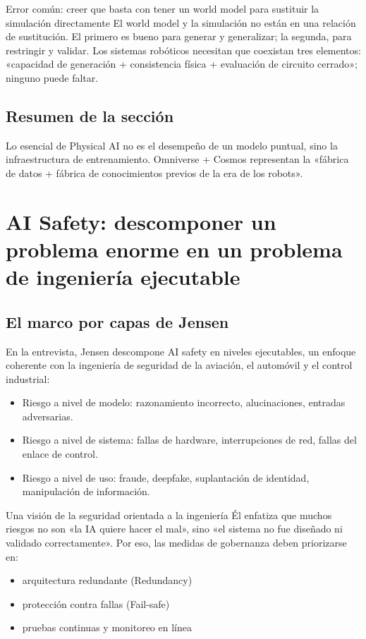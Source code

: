 \documentclass[a4paper]{article}
\begin{document}
\begin{warningbox}{Error común: creer que basta con tener un world model para sustituir la simulación directamente}
El world model y la simulación no están en una relación de sustitución. El primero es bueno para generar y generalizar; la segunda, para restringir y validar. Los sistemas robóticos necesitan que coexistan tres elementos: «capacidad de generación + consistencia física + evaluación de circuito cerrado»; ninguno puede faltar.
\end{warningbox}

\subsection{Resumen de la sección}
Lo esencial de Physical AI no es el desempeño de un modelo puntual, sino la infraestructura de entrenamiento. Omniverse + Cosmos representan la «fábrica de datos + fábrica de conocimientos previos de la era de los robots».

\section{AI Safety: descomponer un problema enorme en un problema de ingeniería ejecutable}

\subsection{El marco por capas de Jensen}

En la entrevista, Jensen descompone AI safety en niveles ejecutables, un enfoque coherente con la ingeniería de seguridad de la aviación, el automóvil y el control industrial:
\begin{itemize}
    \item Riesgo a nivel de modelo: razonamiento incorrecto, alucinaciones, entradas adversarias.
    \item Riesgo a nivel de sistema: fallas de hardware, interrupciones de red, fallas del enlace de control.
    \item Riesgo a nivel de uso: fraude, deepfake, suplantación de identidad, manipulación de información.
\end{itemize}

\begin{importantbox}{Una visión de la seguridad orientada a la ingeniería}
Él enfatiza que muchos riesgos no son «la IA quiere hacer el mal», sino «el sistema no fue diseñado ni validado correctamente». Por eso, las medidas de gobernanza deben priorizarse en:
\begin{itemize}
    \item arquitectura redundante (Redundancy)
    \item protección contra fallas (Fail-safe)
    \item pruebas continuas y monitoreo en línea
\end{itemize}
\end{importantbox}
\end{document}
